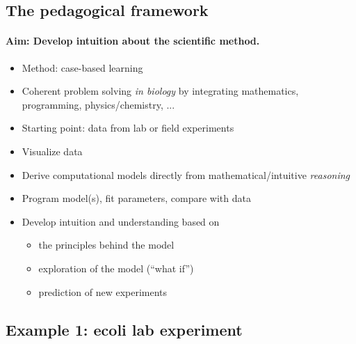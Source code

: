 \documentclass[%
twoside,                 %
final,                   %
10pt]{article}
\begin{document}
\noindent




\subsection*{The pedagogical framework}


\paragraph{Aim: Develop intuition about the scientific method.}
\begin{itemize}
 \item Method: case-based learning

 \item Coherent problem solving \emph{in biology} by integrating
   mathematics, programming, physics/chemistry, ...

 \item Starting point: data from lab or field experiments

 \item Visualize data

 \item Derive computational models directly from mathematical/intuitive \emph{reasoning}

 \item Program model(s), fit parameters, compare with data

 \item Develop intuition and understanding based on
\begin{itemize}

  \item the principles behind the model

  \item exploration of the model (``what if'')

  \item prediction of new experiments
\end{itemize}

\noindent
\end{itemize}

\noindent



\subsection*{Example 1: ecoli lab experiment}
\end{document}
